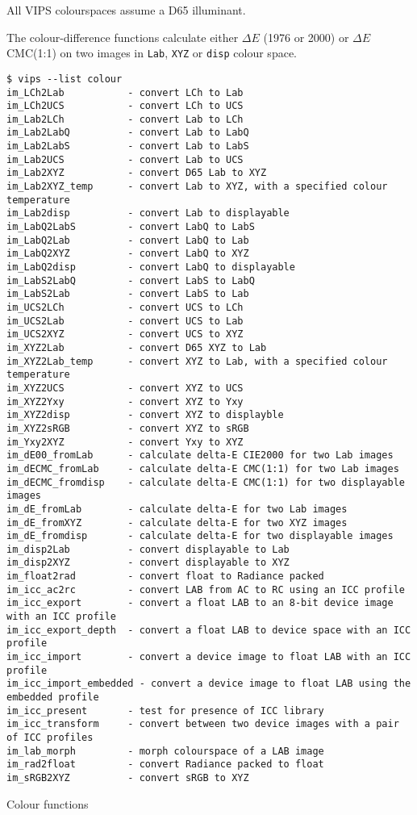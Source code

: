 All VIPS colourspaces assume a D65 illuminant.

The colour-difference functions calculate either $\Delta{}E$ \cielab{} (1976
or 2000) or $\Delta{}E$ CMC(1:1) on two images in \verb+Lab+, \verb+XYZ+ 
or \verb+disp+ colour space.

\begin{fig2}
\begin{verbatim}
$ vips --list colour
im_LCh2Lab           - convert LCh to Lab
im_LCh2UCS           - convert LCh to UCS
im_Lab2LCh           - convert Lab to LCh
im_Lab2LabQ          - convert Lab to LabQ
im_Lab2LabS          - convert Lab to LabS
im_Lab2UCS           - convert Lab to UCS
im_Lab2XYZ           - convert D65 Lab to XYZ
im_Lab2XYZ_temp      - convert Lab to XYZ, with a specified colour temperature
im_Lab2disp          - convert Lab to displayable
im_LabQ2LabS         - convert LabQ to LabS
im_LabQ2Lab          - convert LabQ to Lab
im_LabQ2XYZ          - convert LabQ to XYZ
im_LabQ2disp         - convert LabQ to displayable
im_LabS2LabQ         - convert LabS to LabQ
im_LabS2Lab          - convert LabS to Lab
im_UCS2LCh           - convert UCS to LCh
im_UCS2Lab           - convert UCS to Lab
im_UCS2XYZ           - convert UCS to XYZ
im_XYZ2Lab           - convert D65 XYZ to Lab
im_XYZ2Lab_temp      - convert XYZ to Lab, with a specified colour temperature
im_XYZ2UCS           - convert XYZ to UCS
im_XYZ2Yxy           - convert XYZ to Yxy
im_XYZ2disp          - convert XYZ to displayble
im_XYZ2sRGB          - convert XYZ to sRGB
im_Yxy2XYZ           - convert Yxy to XYZ
im_dE00_fromLab      - calculate delta-E CIE2000 for two Lab images
im_dECMC_fromLab     - calculate delta-E CMC(1:1) for two Lab images
im_dECMC_fromdisp    - calculate delta-E CMC(1:1) for two displayable images
im_dE_fromLab        - calculate delta-E for two Lab images
im_dE_fromXYZ        - calculate delta-E for two XYZ images
im_dE_fromdisp       - calculate delta-E for two displayable images
im_disp2Lab          - convert displayable to Lab
im_disp2XYZ          - convert displayable to XYZ
im_float2rad         - convert float to Radiance packed
im_icc_ac2rc         - convert LAB from AC to RC using an ICC profile
im_icc_export        - convert a float LAB to an 8-bit device image with an ICC profile
im_icc_export_depth  - convert a float LAB to device space with an ICC profile
im_icc_import        - convert a device image to float LAB with an ICC profile
im_icc_import_embedded - convert a device image to float LAB using the embedded profile
im_icc_present       - test for presence of ICC library
im_icc_transform     - convert between two device images with a pair of ICC profiles
im_lab_morph         - morph colourspace of a LAB image
im_rad2float         - convert Radiance packed to float
im_sRGB2XYZ          - convert sRGB to XYZ
\end{verbatim}
\caption{Colour functions}
\label{fg:colour}
\end{fig2}

